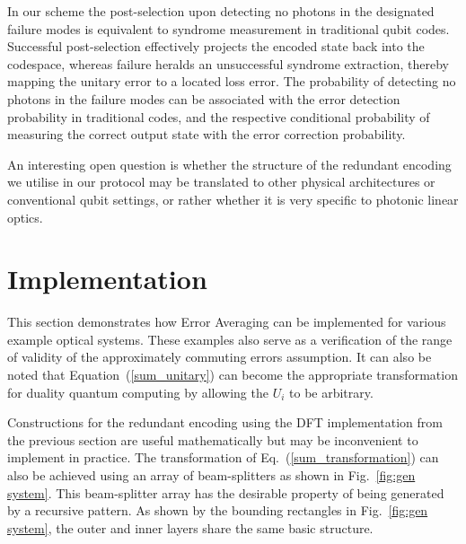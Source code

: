 \documentclass[aps,pra,twocolumn,superscriptaddress,numerical,floatfix]{revtex4-1}
\begin{document}
In our scheme the post-selection upon detecting no photons in the designated failure modes is equivalent to syndrome measurement in traditional qubit codes. Successful post-selection effectively projects the encoded state back into the codespace, whereas failure heralds an unsuccessful syndrome extraction, thereby mapping the unitary error to a located loss error. The probability of detecting no photons in the failure modes can be associated with the error detection probability in traditional codes, and the respective conditional probability of measuring the correct output state with the error correction probability.

An interesting open question is whether the structure of the redundant encoding we utilise in our protocol may be translated to other physical architectures or conventional qubit settings, or rather whether it is very specific to photonic linear optics.

\section{Implementation\label{implementation}}

This section demonstrates how Error Averaging can be implemented for various example optical systems. These examples also serve as a verification of the range of validity of the approximately commuting errors assumption. It can also be noted that Equation~(\ref{sum_unitary}) can become the appropriate transformation for duality quantum computing by allowing the $U_{i}$ to be arbitrary\cite{dualityQC}.

Constructions for the redundant encoding using the DFT implementation from the previous section are useful mathematically but may be inconvenient to implement in practice.  The transformation of Eq.~(\ref{sum_transformation}) can also be achieved using an array of beam-splitters as shown in Fig.~\ref{fig:gen system}.  This beam-splitter array has the desirable property of being generated by a recursive pattern.  As shown by the bounding rectangles in Fig.~\ref{fig:gen system}, the outer and inner layers share the same basic structure. 
\end{document}
